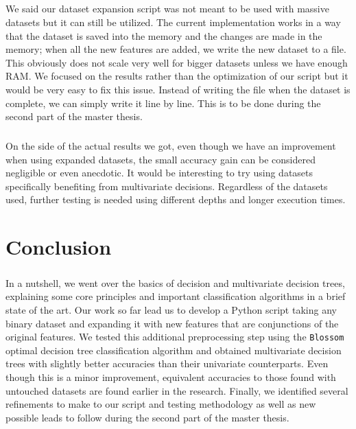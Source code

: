 \documentclass[12pt]{report}
\theoremstyle{definition}
\theoremstyle{definition}
\theoremstyle{definition}
\begin{document}
\paragraph{} We said our dataset expansion script was not meant to be used with massive datasets but it can still
be utilized. The current implementation works in a way that the dataset is saved into the memory and the changes are
made in the memory; when all the new features are added, we write the new dataset to a file. This obviously does not
scale very well for bigger datasets unless we have enough RAM. We focused on the results rather than the optimization
of our script but it would be very easy to fix this issue. Instead of writing the file when the dataset is complete,
we can simply write it line by line. This is to be done during the second part of the master thesis.

\paragraph{} On the side of the actual results we got, even though we have an improvement when using expanded datasets,
the small accuracy gain can be considered negligible or even anecdotic. It would be interesting to try using datasets
specifically benefiting from multivariate decisions. Regardless of the datasets used, further testing is needed using
different depths and longer execution times.



\chapter*{Conclusion}
\paragraph{} In a nutshell, we went over the basics of decision and multivariate decision trees, explaining some core
principles and important classification algorithms in a brief state of the art. Our work so far lead us to develop
a Python script taking any binary dataset and expanding it with new features that are conjunctions of the original
features. We tested this additional preprocessing step using the \texttt{Blossom} optimal decision tree classification
algorithm and obtained multivariate decision trees with slightly better accuracies than their univariate counterparts.
Even though this is a minor improvement, equivalent accuracies to those found with untouched datasets are found earlier
in the research. Finally, we identified several refinements to make to our script and testing methodology as well as
new possible leads to follow during the second part of the master thesis.
\end{document}

